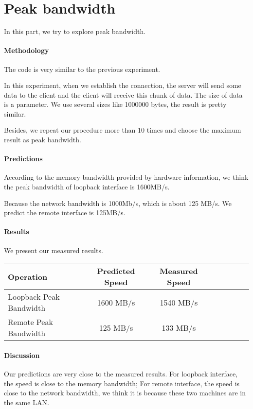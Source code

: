 \section{Peak bandwidth}
In this part, we try to explore peak bandwidth.

\paragraph{Methodology}
The code is very similar to the previous experiment.

In this experiment, when we establish the connection, the server will send some data to the client and the client will receive this chunk of data. The size of data is a parameter. We use several sizes like 1000000 bytes, the result is pretty similar.

Besides, we repeat our procedure more than 10 times and choose the maximum result as peak bandwidth.

\paragraph{Predictions}
According to the memory bandwidth provided by hardware information, we think the peak bandwidth of loopback interface is 1600MB/s.

Because the network bandwidth is 1000Mb/s, which is about 125 MB/s. We predict the remote interface is 125MB/s.

\paragraph{Results}
We present our measured results.

\begin{center}
\begin{tabular}{l*{6}{c}r}
Operation       &  Predicted Speed& Measured Speed\\
\hline
Loopback Peak Bandwidth & 1600 MB/s & 1540 MB/s \\
Remote Peak Bandwidth & 125 MB/s  & 133 MB/s\\
\end{tabular}
\end{center}


\paragraph{Discussion}
Our predictions are very close to the measured results. For loopback interface, the speed is close to the memory bandwidth; For remote interface, the speed is close to the network bandwidth, we think it is because these two machines are in the same LAN.

